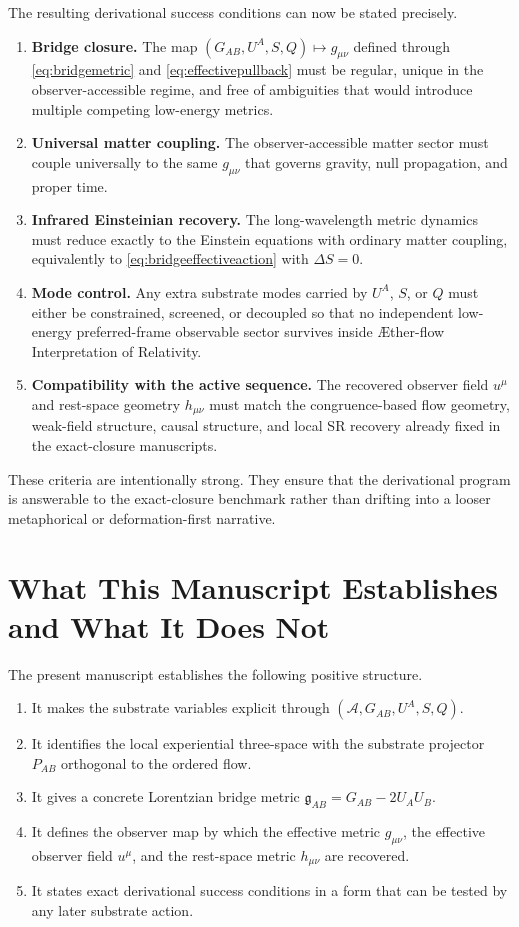 \documentclass[11pt]{article}
\newcommand{\Aflow}{\AE{}ther-flow}
\newcommand{\TheoryName}{\Aflow{} Interpretation of Relativity}
\newcommand{\Sub}{\mathcal{A}}
\newcommand{\BridgeMetric}{\mathfrak{g}}
\begin{document}
The resulting derivational success conditions can now be stated precisely.
\begin{enumerate}
    \item \textbf{Bridge closure.} The map \((G_{AB},U^A,S,Q)\mapsto g_{\mu\nu}\) defined through \eqref{eq:bridgemetric} and \eqref{eq:effectivepullback} must be regular, unique in the observer-accessible regime, and free of ambiguities that would introduce multiple competing low-energy metrics.
    \item \textbf{Universal matter coupling.} The observer-accessible matter sector must couple universally to the same \(g_{\mu\nu}\) that governs gravity, null propagation, and proper time.
    \item \textbf{Infrared Einsteinian recovery.} The long-wavelength metric dynamics must reduce exactly to the Einstein equations with ordinary matter coupling, equivalently to \eqref{eq:bridgeeffectiveaction} with \(\Delta S=0\).
    \item \textbf{Mode control.} Any extra substrate modes carried by \(U^A\), \(S\), or \(Q\) must either be constrained, screened, or decoupled so that no independent low-energy preferred-frame observable sector survives inside \TheoryName{}.
    \item \textbf{Compatibility with the active sequence.} The recovered observer field \(u^\mu\) and rest-space geometry \(h_{\mu\nu}\) must match the congruence-based flow geometry, weak-field structure, causal structure, and local SR recovery already fixed in the exact-closure manuscripts.
\end{enumerate}

These criteria are intentionally strong. They ensure that the derivational program is answerable to the exact-closure benchmark rather than drifting into a looser metaphorical or deformation-first narrative.

\section{What This Manuscript Establishes and What It Does Not}

The present manuscript establishes the following positive structure.
\begin{enumerate}
    \item It makes the substrate variables explicit through \((\Sub,G_{AB},U^A,S,Q)\).
    \item It identifies the local experiential three-space with the substrate projector \(P_{AB}\) orthogonal to the ordered flow.
    \item It gives a concrete Lorentzian bridge metric \(\BridgeMetric_{AB}=G_{AB}-2U_AU_B\).
    \item It defines the observer map by which the effective metric \(g_{\mu\nu}\), the effective observer field \(u^\mu\), and the rest-space metric \(h_{\mu\nu}\) are recovered.
    \item It states exact derivational success conditions in a form that can be tested by any later substrate action.
\end{enumerate}
\end{document}
